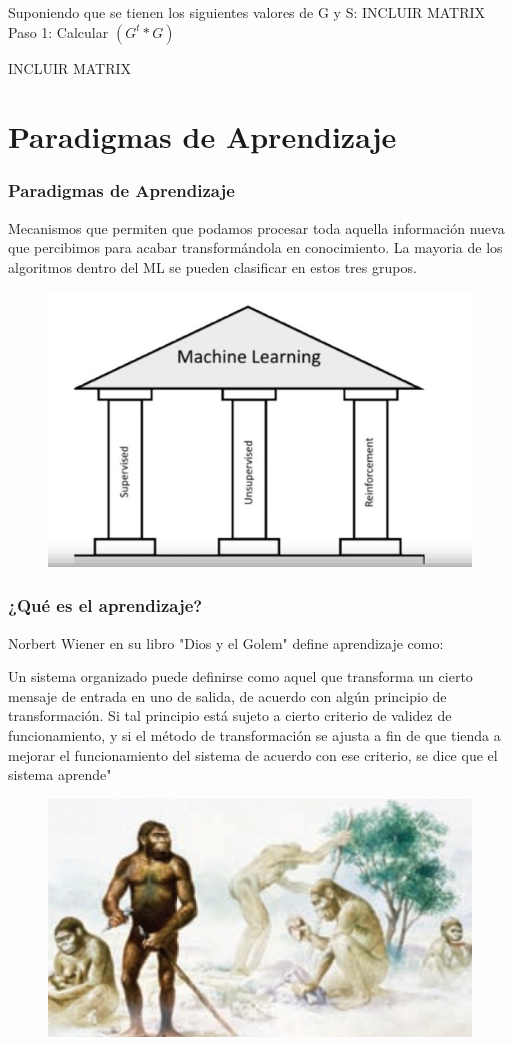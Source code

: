 \documentclass[
	11pt, %
]{beamer}
\begin{document}
\begin{frame}
  \frametitle{}
  Suponiendo que se tienen los siguientes valores de G y S:
  INCLUIR MATRIX
  Paso 1:
  Calcular $(G^{t} * G)$
  
  \bigskip %

  INCLUIR MATRIX
  
\end{frame}

\section{Paradigmas de Aprendizaje}
\begin{frame}
  \frametitle{Paradigmas de Aprendizaje}
  Mecanismos que permiten que podamos procesar toda aquella información nueva que percibimos para acabar transformándola en conocimiento. La mayoria de los algoritmos dentro del ML se pueden clasificar en estos tres grupos.

  \begin{figure}
    \includegraphics[width=0.6\linewidth]{machine.png}
  \end{figure}
  
\end{frame}

\begin{frame}
  \frametitle{¿Qué es el aprendizaje?}

  Norbert Wiener en su libro "Dios y el Golem" define aprendizaje como:
  
  \begin{definition}
    Un sistema organizado puede definirse como aquel que transforma un cierto mensaje de entrada en uno de salida, de acuerdo con algún principio de transformación. Si tal principio está sujeto a cierto criterio de validez de funcionamiento, y si el método de transformación se ajusta a fin de que tienda a mejorar el funcionamiento del sistema de acuerdo con ese criterio, se dice que el sistema aprende"
  \end{definition}

  \begin{figure}
    \includegraphics[width=0.4\linewidth]{homo.jpg}
  \end{figure}
  
\end{frame}
\end{document}
